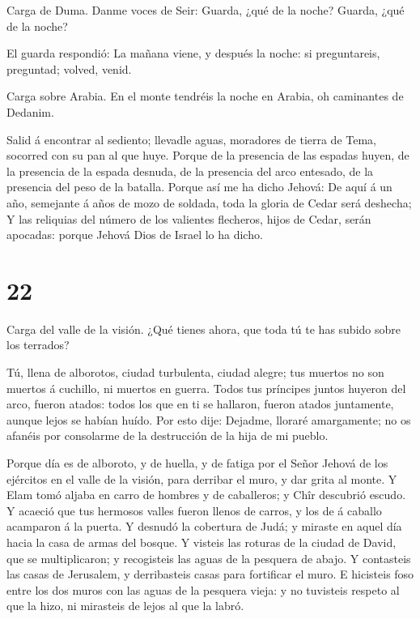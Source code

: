  Carga de Duma. Danme voces de Seir: Guarda, ¿qué de la
noche? Guarda, ¿qué de la noche?

 El guarda respondió: La mañana viene, y después la noche:
si preguntareis, preguntad; volved, venid.

 Carga sobre Arabia. En el monte tendréis la noche en
Arabia, oh caminantes de Dedanim.

 Salid á encontrar al sediento; llevadle aguas, moradores
de tierra de Tema, socorred con su pan al que huye.  Porque
de la presencia de las espadas huyen, de la presencia de la espada
desnuda, de la presencia del arco entesado, de la presencia del peso de
la batalla.  Porque así me ha dicho Jehová: De aquí á un
año, semejante á años de mozo de soldada, toda la gloria de Cedar será
deshecha;  Y las reliquias del número de los valientes
flecheros, hijos de Cedar, serán apocadas: porque Jehová Dios de Israel
lo ha dicho.

\hypertarget{section-21}{%
\section{22}\label{section-21}}

 Carga del valle de la visión. ¿Qué tienes ahora, que toda
tú te has subido sobre los terrados?

 Tú, llena de alborotos, ciudad turbulenta, ciudad alegre;
tus muertos no son muertos á cuchillo, ni muertos en guerra.
 Todos tus príncipes juntos huyeron del arco, fueron atados:
todos los que en ti se hallaron, fueron atados juntamente, aunque lejos
se habían huído.  Por esto dije: Dejadme, lloraré
amargamente; no os afanéis por consolarme de la destrucción de la hija
de mi pueblo.

 Porque día es de alboroto, y de huella, y de fatiga por el
Señor Jehová de los ejércitos en el valle de la visión, para derribar el
muro, y dar grita al monte.  Y Elam tomó aljaba en carro de
hombres y de caballeros; y Chîr descubrió escudo.  Y acaeció
que tus hermosos valles fueron llenos de carros, y los de á caballo
acamparon á la puerta.  Y desnudó la cobertura de Judá; y
miraste en aquel día hacia la casa de armas del bosque.  Y
visteis las roturas de la ciudad de David, que se multiplicaron; y
recogisteis las aguas de la pesquera de abajo.  Y
contasteis las casas de Jerusalem, y derribasteis casas para fortificar
el muro.  E hicisteis foso entre los dos muros con las
aguas de la pesquera vieja: y no tuvisteis respeto al que la hizo, ni
mirasteis de lejos al que la labró.

